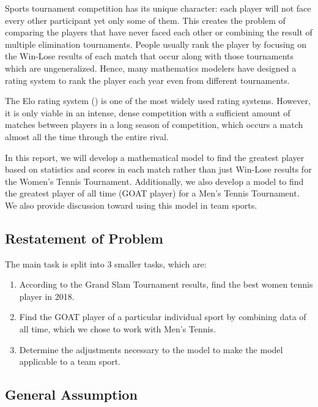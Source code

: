 Sports tournament competition has its unique character: each player will not face every other participant yet only some of them. This creates the problem of comparing the players that have never faced each other or combining the result of multiple elimination tournaments. People usually rank the player by focusing on the Win-Lose results of each match that occur along with those tournaments which are ungeneralized. Hence, many mathematics modelers have designed a rating system to rank the player each year even from different tournaments. %

The Elo rating system (\cite{ELO}) is one of the most widely used rating systems. However, it is only viable in an intense, dense competition with a sufficient amount of matches between players in a long season of competition, which occurs a match almost all the time through the entire rival. %

In this report, we will develop a mathematical model to find the greatest player based on statistics and scores in each match rather than just Win-Lose results for the Women's Tennis Tournament. Additionally, we also develop a model to find the greatest player of all time (GOAT player) for a Men's Tennis Tournament. We also provide discussion toward using this model in team sports. %

\subsection{Restatement of Problem}

The main task is split into 3 smaller tasks, which are:
\begin{enumerate}
\item According to the Grand Slam Tournament results, find the best women tennis player in 2018.
\item Find the GOAT player of a particular individual sport by combining data of all time, which we chose to work with Men's Tennis.
\item Determine the adjustments necessary to the model to make the model applicable to a team sport.
\end{enumerate} %

\subsection{General Assumption}

